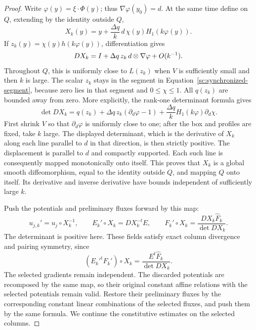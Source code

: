 \begin{proof}
Write $\varphi(y)=\xi\cdot\Phi(y)$; thus
$\nabla\varphi(y_0)=d$. At the same time define on $Q$, extending
by the identity outside $Q$,
\begin{equation}
 \label{sc:local-diffeomorphism}
 X_k(y)=y+\frac{\Delta q}{k}\,
             d\,\chi(y)H_1(k\varphi(y)).
\end{equation}
If $z_k(y)=\chi(y)h(k\varphi(y))$, differentiation gives
\begin{equation}
 \label{sc:jacobian-approximation}
 DX_k=I+\Delta q\,z_k\,d\otimes\nabla\varphi
          +O(k^{-1}).
\end{equation}
Throughout $Q$, this is uniformly close to $L(z_k)$ when $V$ is
sufficiently small and then $k$ is large. The scalar $z_k$ stays in the segment in
Equation~\eqref{sc:synchronized-segment}, because zero lies in
that segment and $0\leq\chi\leq1$. All $q(z_k)$ are bounded
away from zero. More explicitly, the rank-one determinant formula gives
\[
 \det DX_k=q(z_k)+\Delta q\,z_k(\partial_d\varphi-1)
       +\frac{\Delta q}{k}H_1(k\varphi)\partial_d\chi.
\]
First shrink $V$ so that $\partial_d\varphi$ is uniformly close to
one; after the box and profiles are fixed, take $k$ large. The displayed
determinant, which is the derivative of $X_k$ along each line parallel
to $d$ in that direction, is then strictly positive. The displacement is parallel
to $d$ and compactly supported. Each such line is consequently
mapped monotonically onto itself. This proves that $X_k$ is a
global smooth diffeomorphism, equal to the identity outside $Q$,
and mapping $Q$ onto itself. Its derivative and inverse derivative
have bounds independent of sufficiently large $k$.

Push the potentials and preliminary fluxes forward by this map:
\begin{equation}
 \label{sc:pushed-fields}
 u_{j,k}'=u_j\circ X_k^{-1},\qquad
 E_k'\circ X_k=DX_k^{-t}E,\qquad
 F_k'\circ X_k=\frac{DX_k\widehat F_k}{\det DX_k}.
\end{equation}
The determinant is positive here. These fields satisfy exact
column divergence and pairing symmetry, since
\[
 (E_k'^tF_k')\circ X_k
       =\frac{E^t\widehat F_k}{\det DX_k}.
\]
The selected gradients remain independent. The discarded potentials
are recomposed by the same map, so their original constant affine
relations with the selected potentials remain valid. Restore their
preliminary fluxes by the corresponding constant linear combinations
of the selected fluxes, and push them by the same formula. We continue
the constitutive estimates on the selected columns.


\end{proof}
